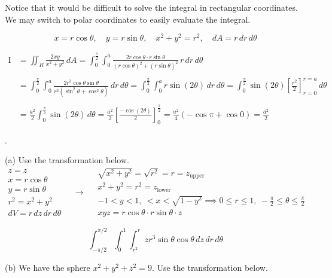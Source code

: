 \documentclass{article}
\begin{document}
\hfill

\noindent Notice that it would be difficult to solve the integral in rectangular coordinates. We may switch to polar coordinates to easily evaluate the integral.

\[x=r\cos\theta,\quad y=r\sin\theta,\quad x^2+y^2=r^2,\quad dA=r\,dr\,d\theta\]

\begin{align*}\mathrm{I}&=\iint_R\frac{2xy}{x^2+y^2}\,dA=\int_0^{\textstyle\frac\pi2}\int_0^a\frac{2r\cos\theta\cdot r\sin\theta}{\left(r\cos\theta\right)^2+\left(r\sin\theta\right)^2}\,r\,dr\,d\theta\\\\&=\int_0^{\textstyle\frac\pi2}\int_0^a\frac{2r^3\cos\theta\sin\theta}{r^2(\sin^2\theta+\cos^2\theta)}\,dr\,d\theta=\int_0^{\textstyle\frac\pi2}\int_0^a r \sin(2\theta)\,dr\,d\theta=\int_0^{\textstyle\frac\pi2}\sin(2\theta)\left[\frac{r^2}2\right]_{r=0}^{r=a}\,d\theta\\\\&=\frac{a^2}2\int_0^{\textstyle\frac\pi2}\sin(2\theta)\,d\theta=\frac{a^2}2\left[\frac{-\cos(2\theta)}2\right]_0^{\textstyle\frac\pi2}=\frac{a^2}4\left(-\cos\pi+\cos0\right)=\boxed{\frac{a^2}2}\end{align*}

.

\hfill

\noindent (a) Use the transformation below.
\[
\begin{array}{c}
z=z\\
x=r\cos\theta\\
y=r\sin\theta\\
r^2=x^2+y^2\\
dV=r\,dz\,dr\,d\theta
\end{array}\quad\rightarrow\quad
\begin{array}{c}
\sqrt{x^2+y^2}=\sqrt{r^2}=r=z_{\text{upper}}\\
x^2+y^2=r^2=z_{\text{lower}}\\
\displaystyle-1<y<1,\:<x<\sqrt{1-y^2}\implies0\leq r\leq1,\:-\frac\pi2\leq\theta\leq\frac\pi2\\
xyz=r\cos\theta\cdot r\sin\theta\cdot z
\end{array}
\]

\[\boxed{\int_{-\pi/2}^{\pi/2}\int_0^1\int_{r^2}^rzr^3\sin\theta\cos\theta\,dz\,dr\,d\theta}\]

\hfill

\noindent (b) We have the sphere $x^2+y^2+z^2=9$. Use the transformation below.
\end{document}
